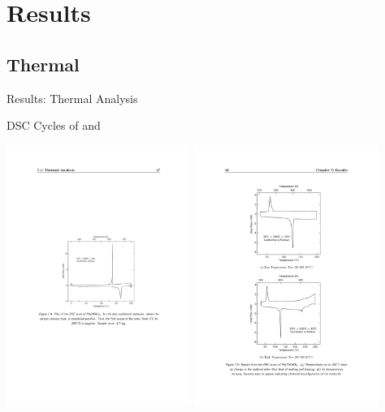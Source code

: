 \documentclass[professionalfont]{beamer}
\begin{document}

\section{Results}

\subsection{Thermal}
\begin{frame}{Results: Thermal Analysis}
\begin{overprint}
		\begin{center}
		DSC Cycles of  and \\
		\vspace{0.5cm}
		\centerline{\includegraphics[width=0.45\textwidth]{./graphics/data/dsc/hfac}%
			\hspace{0.5cm}%
			\includegraphics[width=0.45\textwidth]{./graphics/data/dsc/tmhd}}

\end{center}
\end{overprint}
\end{frame}
\end{document}
